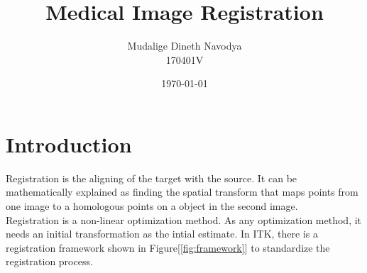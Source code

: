 \documentclass[11pt,english]{article}
\title{Medical Image Registration}
\author{Mudalige Dineth Navodya\\170401V}
\date{\today}
\begin{document}
\maketitle
\thispagestyle{fancy}
\printglossary[title={List of Abbreviations}] %




\section*{Introduction}
Registration is the aligning of the target with the source. It can be mathematically explained as finding the spatial transform that maps points from one image to a homologous points on a object in the second image\cite{itkmanual2}.\\
Registration is a non-linear optimization method. As any optimization method, it needs an initial transformation as the intial estimate\cite{overview}. In \gls{ITK}, there is a registration framework shown in Figure[\ref{fig:framework}] to standardize the registration process.
\end{document}

